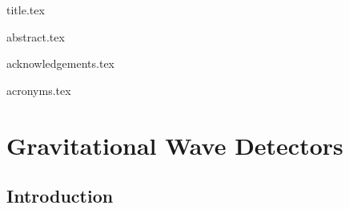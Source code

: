 \documentclass[11pt]{report}
\begin{document}
 

{title.tex}

{abstract.tex}
\newpage

{acknowledgements.tex}
\newpage

\tableofcontents
\newpage

{acronyms.tex}
\newpage

\pagestyle{headings} 

\chapter{Gravitational Wave Detectors}
\section{Introduction}
\end{document}
